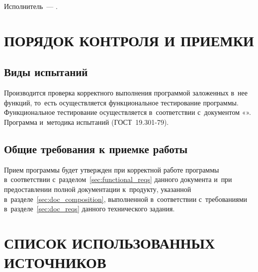 \documentclass[12pt,a4paper]{extarticle}
\begin{document}
Исполнитель~--- \hseAuthorName.

\clearpage

\section{ПОРЯДОК КОНТРОЛЯ И ПРИЕМКИ}

\subsection{Виды испытаний}

Производится проверка корректного выполнения программой заложенных в~нее функций, то~есть осуществляется функциональное тестирование программы. Функциональное тестирование осуществляется в~соответствии с~документом «\projectname». Программа и~методика испытаний (ГОСТ~19.301-79).

\subsection{Общие требования к приемке работы}

Прием программы будет утвержден при корректной работе программы в~соответствии с~разделом~\ref{sec:functional_reqs} данного документа и~при предоставлении полной документации к~продукту, указанной в~разделе~\ref{sec:doc_composition}, выполненной в~соответствии с~требованиями в~разделе~\ref{sec:doc_reqs} данного технического задания.

\clearpage
\pagestyle{appendix}

\section*{СПИСОК ИСПОЛЬЗОВАННЫХ ИСТОЧНИКОВ}
\end{document}
